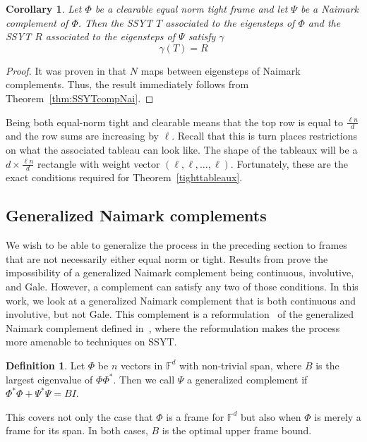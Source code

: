 \documentclass[10pt]{article}
\theoremstyle{plain}
\newtheorem{corollary}[thm]{Corollary}
\theoremstyle{definition}
\newtheorem{definition}[thm]{Definition}
\newcommand{\bF}{\mathbb{F}}
\begin{document}
\begin{corollary}
Let $\Phi$ be a clearable equal norm tight frame and let $\Psi$ be a Naimark complement of $\Phi$. Then the SSYT $T$ associated to the eigensteps of $\Phi$ and the SSYT $R$ associated to the eigensteps of $\Psi$ satisfy $\gamma$
\[
\gamma(T) = R
\]
\end{corollary}

\begin{proof}
It was proven in \cite{HPpolytope} that $N$ maps between eigensteps of Naimark complements. Thus, the result immediately follows from Theorem~\ref{thm:SSYTcompNai}.
\end{proof}

Being both equal-norm tight and clearable means that the top row is equal to $\frac{\ell n}{d}$ and the row sums are increasing by $\ell$. Recall that this is turn places restrictions on what the associated tableau can look like. The shape of the tableaux will be a $d \times \frac{\ell n}{d}$ rectangle with weight vector $(\ell, \ell, \dots, \ell)$. Fortunately, these are the exact conditions required for Theorem~\ref{tighttableaux}. \\

\subsection{Generalized Naimark complements}\label{generalizednaimark}

We wish to be able to generalize the process in the preceding section to frames that are not necessarily either equal norm or tight. Results from \cite{king2025} prove the impossibility of a generalized Naimark complement being continuous, involutive, and Gale. However, a complement can satisfy any two of those conditions. In this work, we look at a generalized Naimark complement that is both continuous and involutive, but not Gale. This complement is a reformulation~\cite{king2025} of the generalized Naimark complement defined in~\cite{CFMevery}, where the reformulation makes the process more amenable to techniques on SSYT.  
\begin{definition}\label{defn:naimnontigh}
    Let $\Phi$ be $n$ vectors in $\bF^d$ with non-trivial span, where $B$ is the largest eigenvalue of $\Phi\Phi^\ast$.  Then we call $\Psi$ a generalized complement if $\Phi^\ast\Phi +\Psi^\ast\Psi = BI$. 
\end{definition}
This covers not only the case that $\Phi$ is a frame for $\bF^d$ but also when $\Phi$ is merely a frame for its span.  
In both cases, $B$ is the optimal upper frame bound. 
\end{document}
